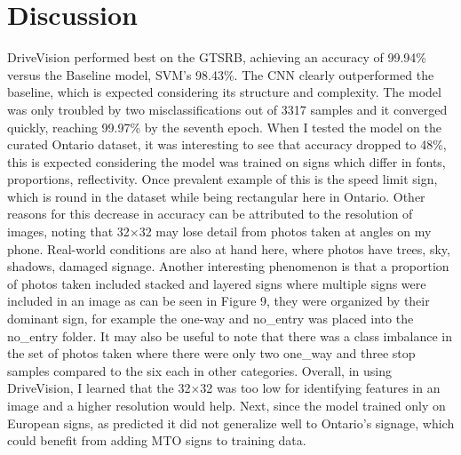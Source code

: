 \documentclass[final]{article}
\begin{document}
\section*{Discussion}
\vspace*{-0.1in}
DriveVision performed best on the GTSRB, achieving an accuracy of 99.94\% versus the Baseline model, SVM's 98.43\%. The CNN clearly outperformed the baseline, which is expected considering its structure and complexity. The model was only troubled by two misclassifications out of 3317 samples and it converged quickly, reaching 99.97\% by the seventh epoch. When I tested the model on the curated Ontario dataset, it was interesting to see that accuracy dropped to 48\%, this is expected considering the model was trained on signs which differ in fonts, proportions, reflectivity. Once prevalent example of this is the speed limit sign, which is round in the dataset while being rectangular here in Ontario. Other reasons for this decrease in accuracy can be attributed to the resolution of images, noting that 32×32 may lose detail from photos taken at angles on my phone. Real-world conditions are also at hand here, where photos have trees, sky, shadows, damaged signage. Another interesting phenomenon is that a proportion of photos taken included stacked and layered signs where multiple signs were included in an image as can be seen in Figure 9, they were organized by their dominant sign, for example the one-way and no\_entry was placed into the no\_entry folder. It may also be useful to note that there was a class imbalance in the set of photos taken where there were only two one\_way and three stop samples compared to the six each in other categories. Overall, in using DriveVision, I learned that the 32×32 was too low for identifying features in an image and a higher resolution would help. Next, since the model trained only on European signs, as predicted it did not generalize well to Ontario’s signage, which could benefit from adding MTO signs to training data. 
\vspace*{-0.2in}
\end{document}
